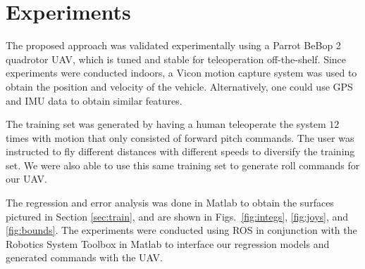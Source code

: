 \documentclass[letterpaper, 10 pt, conference]{ieeeconf}  %
\begin{document}
\section{Experiments} \label{sec:exper}

The proposed approach was validated experimentally using a Parrot BeBop 2 quadrotor UAV, which is tuned and stable for teleoperation off-the-shelf. Since experiments were conducted indoors, a Vicon motion capture system was used to obtain the position and velocity of the vehicle. Alternatively, one could use GPS and IMU data to obtain similar features. 

The training set was generated by having a human teleoperate the system $12$ times with motion that only consisted of forward pitch commands. The user was instructed to fly different distances with different speeds to diversify the training set. We were also able to use this same training set to generate roll commands for our UAV.

The regression and error analysis was done in Matlab to obtain the surfaces pictured in Section \ref{sec:train}, and are shown in Figs.~\ref{fig:integs}, \ref{fig:joys}, and \ref{fig:bounds}. The experiments were conducted using ROS in conjunction with the Robotics System Toolbox in Matlab to interface our regression models and generated commands with the UAV.
\end{document}
